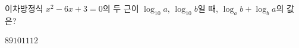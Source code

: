 이차방정식 $x^2-6x+3=0$의 두 근이 $\log_{10} a$, $\log_{10} b$일 때, $\log_a b+\log_b a$의 값은?
\begin{choices32}{$8$}{$9$}{$10$}{$11$}{$12$}\end{choices32}
